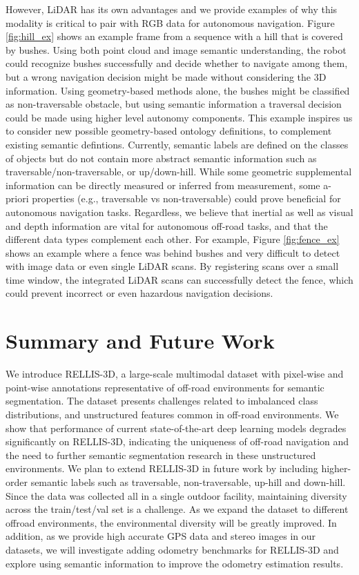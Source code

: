 \documentclass[letterpaper, 10 pt, conference]{ieeeconf}
\begin{document}
However, LiDAR has its own advantages and we provide examples of why this modality is critical to pair with RGB data for autonomous navigation. Figure \ref{fig:hill_ex} shows an example frame from a sequence with a hill that is covered by bushes. Using both point cloud and image semantic understanding, the robot could recognize bushes successfully and decide whether to navigate among them, but a wrong navigation decision might be made without considering the 3D information. Using geometry-based methods alone, the bushes might be classified as non-traversable obstacle, but using semantic information a traversal decision could be made using higher level autonomy components. This example inspires us to consider new possible geometry-based ontology definitions, to complement existing semantic defintions. Currently, semantic labels are defined on the classes of objects but do not contain more abstract semantic information such as traversable/non-traversable, or up/down-hill. While some geometric supplemental information can be directly measured or inferred from measurement, some a-priori properties (e.g., traversable vs non-traversable) could prove beneficial for autonomous navigation tasks. Regardless, we believe that inertial as well as visual and depth information are vital for autonomous off-road tasks, and that the different data types complement each other.
For example, Figure \ref{fig:fence_ex} shows an example where a fence was behind bushes and very difficult to detect with image data or even single LiDAR scans. By registering scans over a small time window, the integrated LiDAR scans can successfully detect the fence, which could prevent incorrect or even hazardous navigation decisions.
 \section{Summary and Future Work}
We introduce RELLIS-3D, a large-scale multimodal dataset with pixel-wise and point-wise annotations representative of off-road environments for semantic segmentation. The dataset presents challenges related to imbalanced class distributions, and unstructured features common in off-road environments. We show that performance of current state-of-the-art deep learning models degrades significantly on RELLIS-3D, indicating the uniqueness of off-road navigation and the need to further semantic segmentation research in these unstructured environments.  
We plan to extend RELLIS-3D in future work by including higher-order semantic labels such as traversable, non-traversable, up-hill and down-hill. Since the data was collected all in a single outdoor facility, maintaining diversity across the train/test/val set is a challenge. As we expand the dataset to different offroad environments, the environmental diversity will be greatly improved. In addition,  as we provide high accurate GPS data and stereo images in our datasets, we will investigate adding odometry benchmarks for RELLIS-3D and explore using semantic information to improve the odometry estimation results.

 












\end{document}
